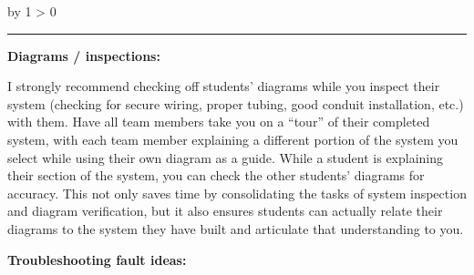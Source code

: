 \documentclass[12pt,a4paper]{article}
\def\notes{
           \advance\explnum by 1
           \ifnum \explnum > 0
                \hrule
                \vskip 3pt
                \leftline{Notes \the\explnum}
                \vskip 3pt \fi}
\begin{document}
\begin{itemize}
\vskip 10pt \filbreak 





\notes{} 

\noindent
{\bf Diagrams / inspections:}

I strongly recommend checking off students' diagrams while you inspect their system (checking for secure wiring, proper tubing, good conduit installation, etc.) with them.  Have all team members take you on a ``tour'' of their completed system, with each team member explaining a different portion of the system you select while using their own diagram as a guide.  While a student is explaining their section of the system, you can check the other students' diagrams for accuracy.  This not only saves time by consolidating the tasks of system inspection and diagram verification, but it also ensures students can actually relate their diagrams to the system they have built and articulate that understanding to you.

\vskip 10pt

\goodbreak

\noindent
{\bf Troubleshooting fault ideas:}


\end{itemize}
\end{document}
